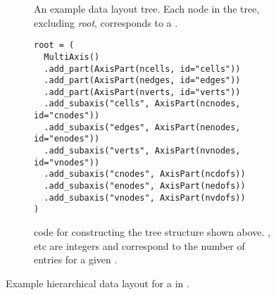 \begin{figure}
  \centering
  \begin{subfigure}{.9\textwidth}
    \centering
    \caption{
      An example data layout tree.
      Each node in the tree, excluding \textit{root}, corresponds to a  .
    }
    \label{fig:vdat_tree}
  \end{subfigure}
  
  \vspace{1em}

  \begin{subfigure}{.9\textwidth}
    \begin{verbatim}
root = (
  MultiAxis()
  .add_part(AxisPart(ncells, id="cells"))
  .add_part(AxisPart(nedges, id="edges"))
  .add_part(AxisPart(nverts, id="verts"))
  .add_subaxis("cells", AxisPart(ncnodes, id="cnodes"))
  .add_subaxis("edges", AxisPart(nenodes, id="enodes"))
  .add_subaxis("verts", AxisPart(nvnodes, id="vnodes"))
  .add_subaxis("cnodes", AxisPart(ncdofs))
  .add_subaxis("enodes", AxisPart(nedofs))
  .add_subaxis("vnodes", AxisPart(nvdofs))
)
    \end{verbatim}
    \caption{
       code for constructing the tree structure shown above.
      ,  etc are integers and correspond to the number of entries for a given .
    }
    \label{lis:demotreecode}
  \end{subfigure}
  \caption{Example hierarchical data layout for a  in .}
  \label{fig:demotree}
\end{figure}

